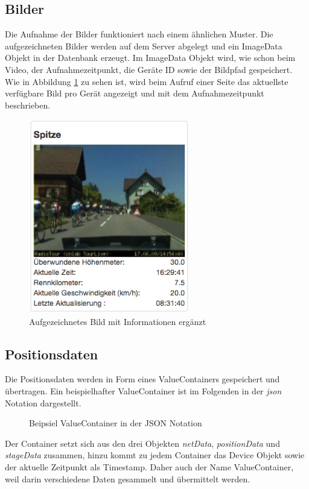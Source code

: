 \subsection{Bilder}
Die Aufnahme der Bilder funktioniert nach einem ähnlichen Muster. Die aufgezeichneten Bilder werden auf dem Server abgelegt und ein ImageData Objekt in der Datenbank erzeugt. Im ImageData Objekt wird, wie schon beim Video, der Aufnahmezeitpunkt, die Geräte ID sowie der Bildpfad gespeichert. Wie in Abbildung \ref{fig:bildaufzeichnung} zu sehen ist, wird beim Aufruf einer Seite das aktuellste verfügbare Bild pro Gerät angezeigt und mit dem Aufnahmezeitpunkt beschrieben.
\begin{figure}[H]
	\centering
	\includegraphics[width=70mm]{images/tourliveweb/bildaufzeichnung.png}
	\caption{Aufgezeichnetes Bild mit Informationen ergänzt}
	\label{fig:bildaufzeichnung}
\end{figure}

\subsection{Positionsdaten}
Die Positionsdaten werden in Form eines ValueContainers gespeichert und übertragen. Ein beispielhafter ValueContainer ist im Folgenden in der \textit{\gls{json}} Notation dargestellt.

\begin{figure}[H]
	\centering
	
	\caption{Beipsiel ValueContainer in der JSON Notation}
	\label{fig:valuecontainerjson}	
\end{figure}

Der Container setzt sich aus den drei Objekten \textit{netData}, \textit{positionData} und \textit{stageData} zusammen, hinzu kommt zu jedem Container das Device Objekt sowie der aktuelle Zeitpunkt als Timestamp. Daher auch der Name ValueContainer, weil darin verschiedene Daten gesammelt und übermittelt werden.
\\

